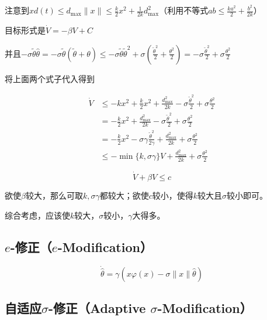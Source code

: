 注意到\(xd(t) \leq d_{\max} \parallel x \parallel \leq \frac{k}{2}x^{2} + \frac{1}{2k}d_{\max}^{2}\)（利用不等式\(ab \leq \frac{ka^{2}}{2} + \frac{b^{2}}{2k}\)）

目标形式是\(\dot{V} = - \beta V + C\)

并且\(- \sigma\tilde{\theta}\hat{\theta} = - \sigma\tilde{\theta}(\tilde{\theta} + \theta) \leq - \sigma\tilde{\theta}{\tilde{\theta}}^{2} + \sigma(\frac{{\tilde{\theta}}^{2}}{2} + \frac{\theta^{2}}{2}) = - \sigma\frac{{\tilde{\theta}}^{2}}{2} + \sigma\frac{\theta^{2}}{2}\)

将上面两个式子代入得到

\begin{align*}
\dot{V} & \leq - kx^{2} + \frac{k}{2}x^{2} + \frac{d_{\max}^{2}}{2k} - \sigma\frac{{\tilde{\theta}}^{2}}{2} + \sigma\frac{\theta^{2}}{2} \\
 & = - \frac{k}{2}x^{2} + \frac{d_{\max}^{2}}{2k} - \sigma\frac{{\tilde{\theta}}^{2}}{2} + \sigma\frac{\theta^{2}}{2} \\
 & = - \frac{k}{2}x^{2} - \sigma\gamma\frac{{\tilde{\theta}}^{2}}{2\gamma} + \frac{d_{\max}^{2}}{2k} + \sigma\frac{\theta^{2}}{2} \\
 & \leq - \min\{ k,\sigma\gamma\} V + \frac{d_{\max}^{2}}{2k} + \sigma\frac{\theta^{2}}{2}
\end{align*}

\[\dot{V} + \beta V \leq c\]

欲使\(\beta\)较大，那么可取\(k,\sigma\gamma\)都较大；欲使\(c\)较小，使得\(k\)较大且\(\sigma\)较小即可。

综合考虑，应该使\(k\)较大，\(\sigma\)较小，\(\gamma\)大得多。


\subsection{\texorpdfstring{$e$-修正（$e$-Modification）}{e-修正（e-Modification）}}

\[\dot{\hat{\theta}} = \gamma(x\varphi(x) - \sigma \parallel x \parallel \hat{\theta})\]

\subsection{\texorpdfstring{自适应$\sigma$-修正（Adaptive $\sigma$-Modification）}{自适应σ-修正（Adaptive σ-Modification）}}